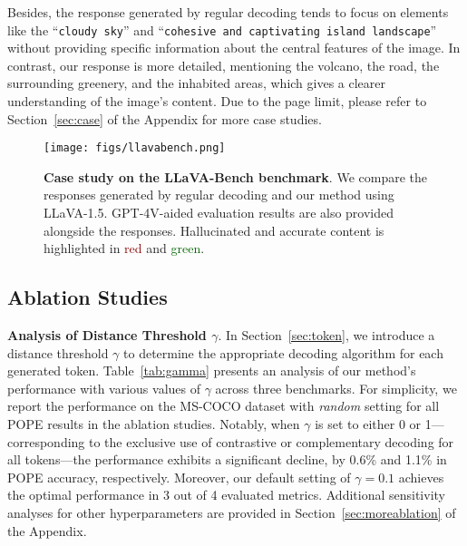 Besides, the response generated by regular decoding tends to focus on elements like the ``\texttt{cloudy sky}'' and ``\texttt{cohesive and captivating island landscape}'' without providing specific information about the central features of the image. In contrast, our response is more detailed, mentioning the volcano, the road, the surrounding greenery, and the inhabited areas, which gives a clearer understanding of the image's content. 
Due to the page limit, please refer to Section~\ref{sec:case} of the Appendix for more case studies.



\begin{figure}[t]
\centering
\texttt{[image: figs/llavabench.png]}
\vspace{-18pt}
\caption{\textbf{Case study on the LLaVA-Bench benchmark}. We compare the responses generated by regular decoding and our method using LLaVA-1.5. GPT-4V-aided evaluation results are also provided alongside the responses. Hallucinated and accurate content is highlighted in \textcolor{darkred}{red} and \textcolor{darkgreen}{green}.} 
\vspace{-12pt}
\label{fig:llavabench}
\end{figure}



\subsection{Ablation Studies}
\textbf{Analysis of Distance Threshold $\gamma$}. In Section~\ref{sec:token}, we introduce a distance threshold $\gamma$ to determine the appropriate decoding algorithm for each generated token. Table~\ref{tab:gamma} presents an analysis of our method's performance with various values of $\gamma$ across three benchmarks. For simplicity, we report the performance on the MS-COCO dataset with \textit{random} setting for all POPE results in the ablation studies.
Notably, when $\gamma$ is set to either 0 or 1—corresponding to the exclusive use of contrastive or complementary decoding for all tokens—the performance exhibits a significant decline, by 0.6\% and 1.1\% in POPE accuracy, respectively. Moreover, our default setting of $\gamma=0.1$ achieves the optimal performance in 3 out of 4 evaluated metrics. Additional sensitivity analyses for other hyperparameters are provided in Section~\ref{sec:moreablation} of the Appendix.

